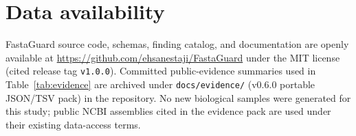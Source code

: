 \documentclass[11pt,a4paper]{article}
\begin{document}
\section*{Data availability}
FastaGuard source code, schemas, finding catalog, and documentation are openly
available at \url{https://github.com/ehsanestaji/FastaGuard} under the MIT
license (cited release tag \texttt{v1.0.0}).
Committed public-evidence summaries used in Table~\ref{tab:evidence} are
archived under \texttt{docs/evidence/} (v0.6.0 portable JSON/TSV pack) in the
repository.
No new biological samples were generated for this study; public NCBI assemblies
cited in the evidence pack are used under their existing data-access terms.



\end{document}
